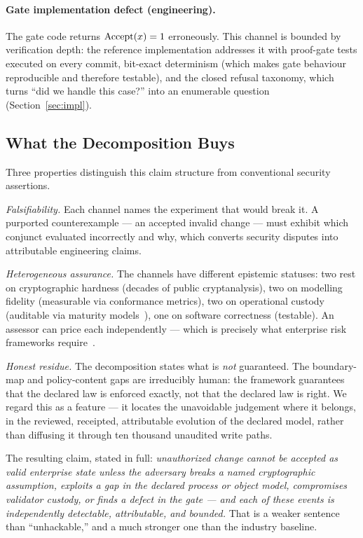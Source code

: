 \paragraph{Gate implementation defect (engineering).}
The gate code returns $\operatorname{Accept}(x) = 1$ erroneously. This channel is bounded by
verification depth: the reference implementation addresses it with proof-gate
tests executed on every commit, bit-exact determinism (which makes gate
behaviour reproducible and therefore testable), and the closed refusal
taxonomy, which turns ``did we handle this case?'' into an enumerable question
(Section~\ref{sec:impl}).

\subsection{What the Decomposition Buys}
\label{sec:decomp-value}

Three properties distinguish this claim structure from conventional security
assertions.

\emph{Falsifiability.} Each channel names the experiment that would break it.
A purported counterexample --- an accepted invalid change --- must exhibit
which conjunct evaluated incorrectly and why, which converts security disputes
into attributable engineering claims.

\emph{Heterogeneous assurance.} The channels have different epistemic
statuses: two rest on cryptographic hardness (decades of public cryptanalysis),
two on modelling fidelity (measurable via conformance metrics), two on
operational custody (auditable via maturity models~\cite{sok_ccmm_2024}), one
on software correctness (testable). An assessor can price each independently
--- which is precisely what enterprise risk frameworks
require~\cite{ea_security_togaf_2017}.

\emph{Honest residue.} The decomposition states what is \emph{not} guaranteed.
The boundary-map and policy-content gaps are irreducibly human: the framework
guarantees that the declared law is enforced exactly, not that the declared law
is right. We regard this as a feature --- it locates the unavoidable judgement
where it belongs, in the reviewed, receipted, attributable evolution of the
declared model, rather than diffusing it through ten thousand unaudited write
paths.

The resulting claim, stated in full: \emph{unauthorized change cannot be
accepted as valid enterprise state unless the adversary breaks a named
cryptographic assumption, exploits a gap in the declared process or object
model, compromises validator custody, or finds a defect in the gate --- and
each of these events is independently detectable, attributable, and bounded.}
That is a weaker sentence than ``unhackable,'' and a much stronger one than
the industry baseline.
